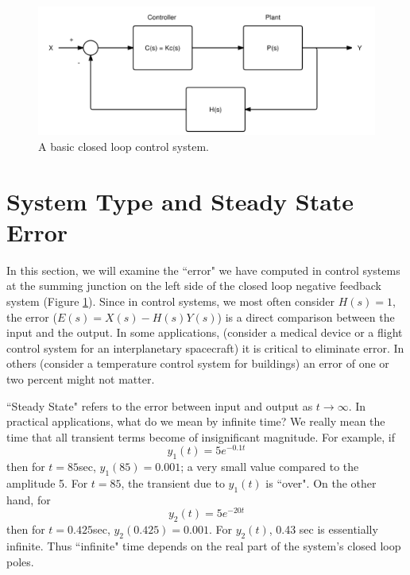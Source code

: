 \begin{figure}[b]\centering
\includegraphics[width=4.5in]{figs11/cl_rl_systema.png}	%
\caption{A basic closed loop control system.}\label{basicCLfig}
\end{figure}

%
%


\section{System Type and Steady State Error}

In this section, we will examine the ``error" we have computed in control systems at the summing junction on the left side of the closed loop negative feedback system (Figure \ref{basicCLfig}).  Since in control systems, we most often consider $H(s) = 1$,  the error ($E(s) = X(s)-H(s)Y(s)$)
is a direct comparison between the input and the output.  In some applications, (consider a medical device or a flight control system for an interplanetary spacecraft) it is critical to eliminate error.  In others (consider a temperature control system for buildings) an error of one or two percent might not matter.

``Steady State" refers to the error between input and output as $t\to\infty$.  In practical applications, 
what do we mean by infinite time?  
We really mean the time that all transient terms become of insignificant magnitude.   For example, if 
\[
y_1(t) = 5e^{-0.1t}
\]
then for $t = 85$sec, $y_1(85) = 0.001$; a very small value compared to the amplitude 5.  For $t=85$, 
the transient due to $y_1(t)$ is ``over". On the other hand, for 
\[
y_2(t) = 5e^{-20t}
\]
then for $t = 0.425$sec, $y_2(0.425) = 0.001$.   For $y_2(t)$,  0.43 sec is essentially infinite.   
Thus ``infinite" time depends on the real part of the system's closed loop poles. 

